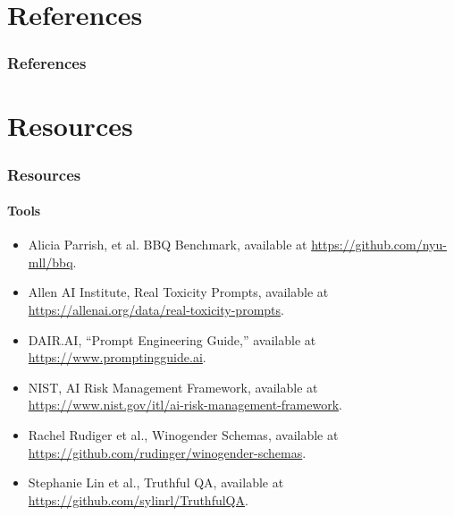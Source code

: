 \documentclass[11pt,
               aspectratio=169,
               hyperref={colorlinks}
               ]{beamer}
\begin{document}

	\section{References}

	\begin{frame}[t, allowframebreaks]
	
		\frametitle{References}	
				
		\printbibliography
		
	\end{frame}


 	\section{Resources} 

\begin{frame}
	
	\frametitle{Resources}
	\framesubtitle{Tools}
	
	\begin{itemize}
		\item Alicia Parrish, et al. BBQ Benchmark, available at \url{https://github.com/nyu-mll/bbq}.
		\item Allen AI Institute, Real Toxicity Prompts, available at \url{https://allenai.org/data/real-toxicity-prompts}.
		\item DAIR.AI, “Prompt Engineering Guide,” available at \url{https://www.promptingguide.ai}.
		\item NIST, AI Risk Management Framework, available at \url{https://www.nist.gov/itl/ai-risk-management-framework}.
		\item Rachel Rudiger et al., Winogender Schemas, available at \url{https://github.com/rudinger/winogender-schemas}.
		\item Stephanie Lin et al., Truthful QA, available at \url{https://github.com/sylinrl/TruthfulQA}.
	\end{itemize}	
	
\end{frame}	


\end{document}
